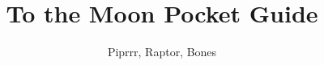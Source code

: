 \documentclass[fontsize=10pt,paper=B5,titlepage,numbers=noenddot,DIV=16]{scrreprt}
\title{To the Moon Pocket Guide}
\author{Piprrr, Raptor, Bones}
\newcommand\BackgroundPic{%
\put(0,0){%
\parbox[b][\paperheight]{\paperwidth}{%
\vfill
\centering
\texttt{[image: images/coverpageFM3-preview.jpg]}%
\vfill
}}}
\begin{document}
\frenchspacing %

\begin{titlepage}








{~}

\end{titlepage}

\maketitle

\cleardoublepage

\tableofcontents

\pagestyle{headings}

\listoftodos

% 

% 

% 

% 

% 








\end{document}
